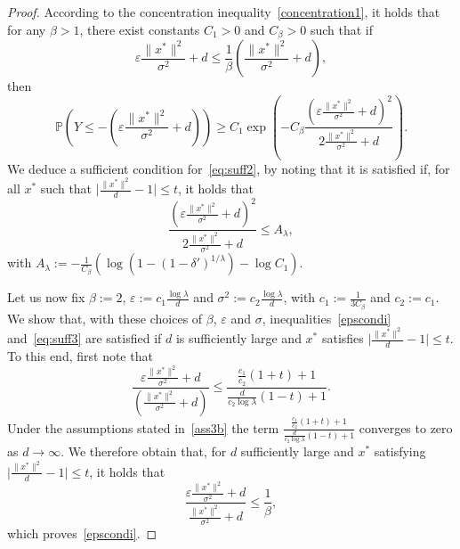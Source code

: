 \begin{proof}
According to the concentration inequality~\ref{concentration1}, it holds that for any $\beta>1$, there exist constants $C_1>0$ and $C_\beta>0$ such that if 
\begin{equation}
\label{epscondi}
    \varepsilon\frac{\lVert x^*\rVert^2}{\sigma^2}+d \leq \frac1\beta \left(\frac{\lVert x^*\rVert^2}{\sigma^2}+d\right),
\end{equation}
then 
$$\mathbb{P}\left(Y\leq -\left(\varepsilon\frac{\lVert x^*\rVert^2}{\sigma^2}+d\right)\right) \geq C_1 \exp{\left(-C_\beta \frac{(\varepsilon\frac{\lVert x^*\rVert^2}{\sigma^2}+d)^2}{2\frac{\lVert x^*\rVert^2}{\sigma^2}+d}\right)}.$$
We deduce a sufficient condition for~\eqref{eq:suff2}, by noting that it is satisfied if, for all $x^*$ such that $\lvert\frac{\lVert x^*\rVert^2}{d}-1\rvert\leq t$, it holds that
\begin{equation}
\frac{\left(\varepsilon\frac{\lVert x^*\rVert^2}{\sigma^2}+d\right)^2}{2\frac{\lVert x^*\rVert^2}{\sigma^2}+d} \leq A_\lambda,
\label{eq:suff3}
\end{equation}
with $A_\lambda := -\frac{1}{C_\beta}\left(\log\left(1-(1-\delta')^{1/\lambda}\right)-\log C_1\right)$. 

Let us now fix $\beta:=2$, $\varepsilon := c_1\frac{\log\lambda}{d}$ and $\sigma^2:=c_2\frac{\log\lambda}{d}$, with $c_1 := \frac{1}{3 C_\beta}$ and $c_2:=c_1$. 
We show that, with these choices of $\beta$, $\varepsilon$ and $\sigma$, inequalities~\eqref{epscondi} and~\ref{eq:suff3} are satisfied if $d$ is sufficiently large and $x^*$ satisfies $\lvert\frac{\lVert x^*\rVert^2}{d}-1\rvert\leq t$. 
To this end, first note that 
$$\frac{\varepsilon\frac{\lVert x^*\rVert^2}{\sigma^2}+d}{ (\frac{\lVert x^*\rVert^2}{\sigma^2}+d)}\leq  \frac{\frac{c_1}{c_2}(1+t)+1}{\frac{d}{c_2\log\lambda}(1-t)+1}.$$
Under the assumptions stated in~\eqref{ass3b} the term $\frac{\frac{c_1}{c_2}(1+t)+1}{\frac{d}{c_2\log\lambda}(1-t)+1}$ converges to zero as $d\rightarrow \infty$. 
We therefore obtain that, for $d$ sufficiently large and $x^*$ satisfying $\lvert\frac{\lVert x^*\rVert^2}{d}-1\rvert\leq t$, it holds that  $$\frac{\varepsilon\frac{\lVert x^*\rVert^2}{\sigma^2}+d}{\frac{\lVert x^*\rVert^2}{\sigma^2}+d} \leq \frac1\beta,$$
which proves~\eqref{epscondi}. 


\end{proof}
